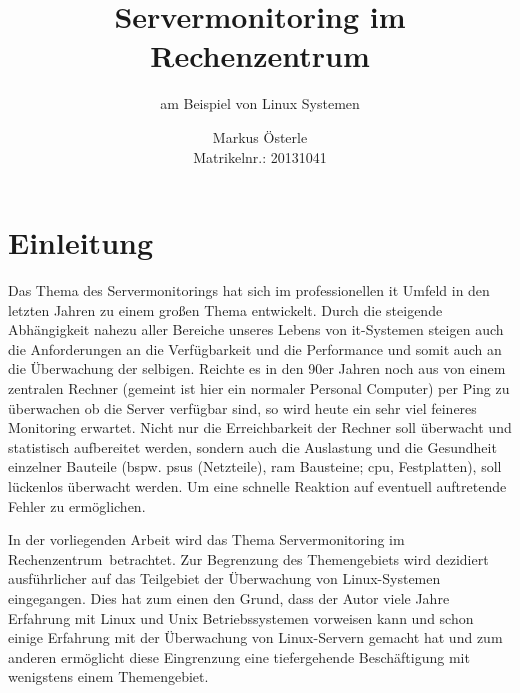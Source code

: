 \documentclass[12pt,a4paper,parskip,listof=totoc,bibliography=totoc]{scrreprt}
\begin{document}
	\subject{Seminararbeit im Studiengang \glqq Verwaltungsinformatik\grqq}
	\author{Markus Österle\\ Matrikelnr.: 20131041}
	\title{Servermonitoring im Rechenzentrum}
	\subtitle{am Beispiel von Linux Systemen}
	\publishers{Betreut von Dipl. Inf. Stefan Müller}
	\date{} %

	\maketitle
	
	\tableofcontents
	\onehalfspacing
	\chapter{Einleitung}
	Das Thema des Servermonitorings hat sich im professionellen \acrshort{it} Umfeld in den letzten Jahren zu einem großen Thema entwickelt. Durch die steigende Abhängigkeit nahezu aller Bereiche unseres Lebens von \acrshort{it}-Systemen steigen auch die Anforderungen an die Verfügbarkeit und die Performance und somit auch an die Überwachung der selbigen. Reichte es in den 90er Jahren noch aus von einem zentralen Rechner (gemeint ist hier ein normaler Personal Computer) per Ping zu überwachen ob die Server verfügbar sind, so wird heute ein sehr viel feineres Monitoring erwartet. Nicht nur die Erreichbarkeit der Rechner soll überwacht und statistisch aufbereitet werden, sondern auch die Auslastung und die Gesundheit einzelner Bauteile (bspw. \acrlong{psu}s (Netzteile), \acrshort{ram} Bausteine; \acrshort{cpu}, Festplatten), soll lückenlos überwacht werden. Um eine schnelle Reaktion auf eventuell auftretende Fehler zu ermöglichen. 

	In der vorliegenden Arbeit wird das Thema \glqq Servermonitoring im Rechenzentrum\grqq\ betrachtet. Zur Begrenzung des Themengebiets wird dezidiert ausführlicher auf das Teilgebiet der Überwachung von Linux-Systemen eingegangen. Dies hat zum einen den Grund, dass der Autor viele Jahre Erfahrung mit Linux und Unix Betriebssystemen vorweisen kann und schon einige Erfahrung mit der Überwachung von Linux-Servern gemacht hat und zum anderen ermöglicht diese Eingrenzung eine tiefergehende Beschäftigung mit wenigstens einem Themengebiet.
\end{document}
